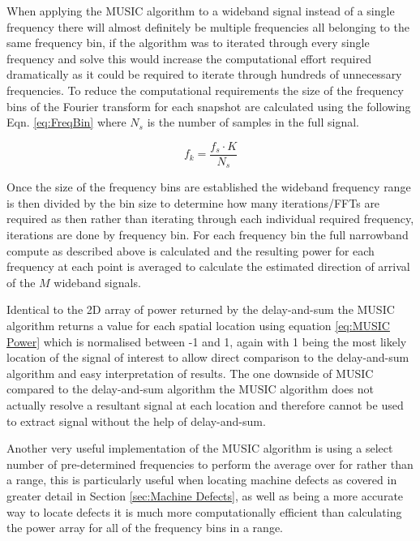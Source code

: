 \documentclass{UoNMCHA}
\numberwithin{equation}{section}
\begin{document}
    When applying the MUSIC algorithm to a wideband signal instead of a single frequency there will almost definitely be multiple frequencies all belonging to the same frequency bin, if the algorithm was to iterated through every single frequency and solve this would increase the computational effort required dramatically as it could be required to iterate through hundreds of unnecessary frequencies. To reduce the computational requirements the size of the frequency bins of the Fourier transform for each snapshot are calculated using the following Eqn. \ref{eq:FreqBin} where $N_s$ is the number of samples in the full signal.
    
    \begin{equation}
        f_{k} =\frac{f_s \cdot K}{N_s}
        \label{eq:FreqBin}
    \end{equation}
    
    Once the size of the frequency bins are established the wideband frequency range is then divided by the bin size to determine how many iterations/FFTs are required as then rather than iterating through each individual required frequency, iterations are done by frequency bin. For each frequency bin the full narrowband compute as described above is calculated and the resulting power for each frequency at each point is averaged to calculate the estimated direction of arrival of the $M$ wideband signals.
    
    Identical to the 2D array of power returned by the delay-and-sum the MUSIC algorithm returns a value for each spatial location using equation \ref{eq:MUSIC Power} which is normalised between -1 and 1, again with 1 being the most likely location of the signal of interest to allow direct comparison to the delay-and-sum algorithm and easy interpretation of results. The one downside of MUSIC compared to the delay-and-sum algorithm the MUSIC algorithm does not actually resolve a resultant signal at each location and therefore cannot be used to extract signal without the help of delay-and-sum. 
    
    Another very useful implementation of the MUSIC algorithm is using a select number of pre-determined frequencies to perform the average over for rather than a range, this is particularly useful when locating machine defects as covered in greater detail in Section \ref{sec:Machine Defects}, as well as being a more accurate way to locate defects it is much more computationally efficient than calculating the power array for all of the frequency bins in a range.
    
\end{document}
